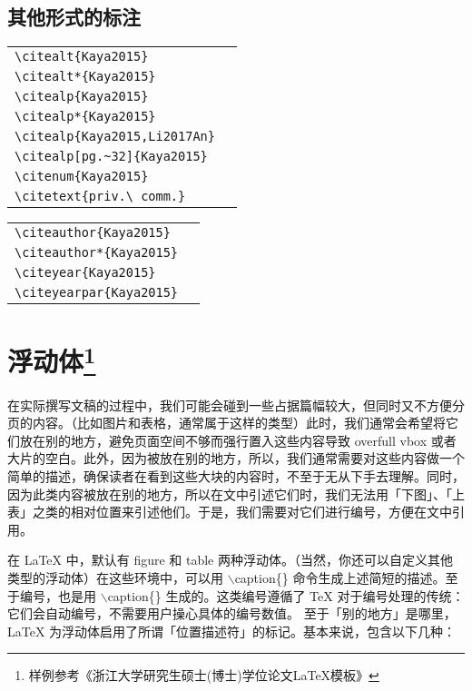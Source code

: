 \subsection{其他形式的标注}
\noindent
\begin{tabular}{l@{\quad$\Rightarrow$\quad}l}
	\verb|\citealt{Kaya2015}| & \citealt{Kaya2015}\\
	\verb|\citealt*{Kaya2015}| & \citealt*{Kaya2015}\\
	\verb|\citealp{Kaya2015}| & \citealp{Kaya2015}\\
	\verb|\citealp*{Kaya2015}| & \citealp*{Kaya2015}\\
	\verb|\citealp{Kaya2015,Li2017An}| & \citealp{Kaya2015,Li2017An}\\
	\verb|\citealp[pg.~32]{Kaya2015}| & \citealp[pg.~32]{Kaya2015}\\
	\verb|\citenum{Kaya2015}| & \citenum{Kaya2015}\\
	\verb|\citetext{priv.\ comm.}| & \citetext{priv.\ comm.}\\
\end{tabular}

\noindent
\begin{tabular}{l@{\quad$\Rightarrow$\quad}l}
	\verb|\citeauthor{Kaya2015}| & \citeauthor{Kaya2015}\\
	\verb|\citeauthor*{Kaya2015}| & \citeauthor*{Kaya2015}\\
	\verb|\citeyear{Kaya2015}| & \citeyear{Kaya2015}\\
	\verb|\citeyearpar{Kaya2015}| & \citeyearpar{Kaya2015}\\
\end{tabular}

\section{浮动体\footnote{样例参考《浙江大学研究生硕士(博士)学位论文\LaTeX{}模板》}}
在实际撰写文稿的过程中，我们可能会碰到一些占据篇幅较大，但同时又不方便分页的内容。（比如图片和表格，通常属于这样的类型）此时，我们通常会希望将它们放在别的地方，避免页面空间不够而强行置入这些内容导致 overfull vbox 或者大片的空白。此外，因为被放在别的地方，所以，我们通常需要对这些内容做一个简单的描述，确保读者在看到这些大块的内容时，不至于无从下手去理解。同时，因为此类内容被放在别的地方，所以在文中引述它们时，我们无法用「下图」、「上表」之类的相对位置来引述他们。于是，我们需要对它们进行编号，方便在文中引用。

在 \LaTeX{} 中，默认有 figure 和 table 两种浮动体。（当然，你还可以自定义其他类型的浮动体）在这些环境中，可以用 $\backslash$caption\{\} 命令生成上述简短的描述。至于编号，也是用 $\backslash$caption\{\} 生成的。这类编号遵循了 TeX 对于编号处理的传统：它们会自动编号，不需要用户操心具体的编号数值。 至于「别的地方」是哪里，\LaTeX{} 为浮动体启用了所谓「位置描述符」的标记。基本来说，包含以下几种：


